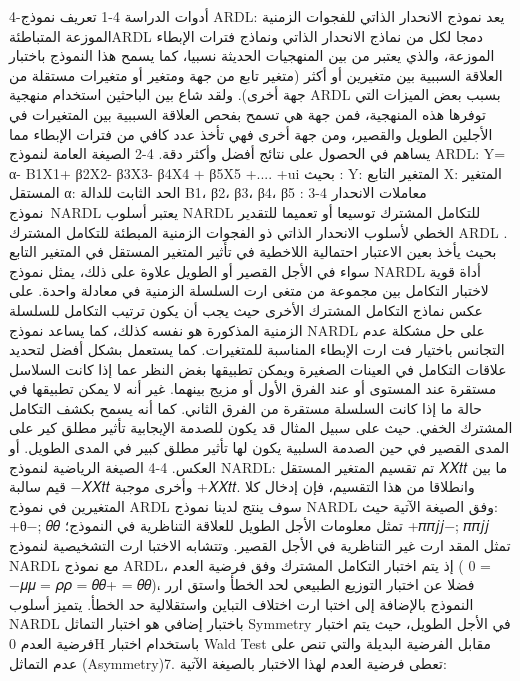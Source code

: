 \documentclass[12pt,a4paper]{report}
\begin{document}
4-أدوات الدراسة 
4-1 تعريف نموذج ARDL:
        يعد نموذج الانحدار الذاتي للفجوات الزمنية الموزعة المتباطئةARDL دمجا لكل من نماذج الانحدار الذاتي ونماذج فترات الإبطاء الموزعة، والذي يعتبر من بين المنهجيات الحديثة نسبيا، كما يسمح هذا النموذج باختبار العلاقة السببية بين متغيرين أو أكثر (متغير تابع من جهة ومتغير أو متغيرات مستقلة من جهة أخرى). ولقد شاع بين الباحثين استخدام منهجية ARDL بسبب بعض الميزات التي توفرها هذه المنهجية، فمن جهة هي تسمح بفحص العلاقة السببية بين المتغيرات في الأجلين الطويل والقصير، ومن جهة أخرى فهي تأخذ عدد كافي من فترات الإبطاء مما يساهم في الحصول على نتائج أفضل وأكثر دقة.
4-2 الصيغة العامة لنموذج ARDL:
     Y= α-  Β1X1+ β2X2- β3X3- β4X4 + β5X5 +.... +ui  
بحيث :
Y: المتغير التابع
X: المتغير المستقل 
α: الحد الثابت للدالة
Β1، β2، β3، β4، β5 : معاملات الانحدار 
4-3 نموذج NARDL 
      یعتبر أسلوب NARDL للتكامل المشترك  توسيعا أو تعميما للتقدير الخطي لأسلوب الانحدار الذاتي ذو الفجوات الزمنیة المبطئة للتكامل المشترك ARDL	. بحیث یأخذ بعین الاعتبار احتمالية اللاخطیة في تأثیر المتغير المستقل في المتغير التابع سواء في الأجل القصير أو الطويل علاوة على ذلك، یمثل نموذج NARDL أداة قویة لاختبار التكامل بین مجموعة من متغی ارت السلسلة الزمنية في معادلة واحدة. على عكس نماذج التكامل المشترك الأخرى حیث یجب أن یكون ترتیب التكامل للسلسلة الزمنیة المذكورة هو نفسه كذلك، كما یساعد نموذج NARDL على حل مشكلة عدم التجانس باختیار فت ارت الإبطاء المناسبة للمتغیرات. 
     كما یستعمل بشكل أفضل لتحدید علاقات التكامل في العینات الصغیرة ویمكن تطبیقها بغض النظر عما إذا كانت السلاسل مستقرة عند المستوى أو عند الفرق الأول أو مزیج بینهما. غیر أنه لا یمكن تطبیقها في حالة ما إذا كانت السلسلة مستقرة من الفرق الثاني. كما أنه یسمح بكشف التكامل المشترك الخفي. حیث على سبیل المثال قد یكون للصدمة الإیجابیة تأثیر مطلق كیر على المدى القصیر في حین الصدمة السلبية یكون لها تأثیر مطلق كبیر في المدى الطويل. أو العكس.
4-4 الصیغة الریاضیة لنموذج NARDL: 
    تم تقسیم المتغیر المستقل 𝑋𝑋𝑡𝑡 ما بین قیم سالبة −𝑋𝑋𝑡𝑡 وأخرى موجبة +𝑋𝑋𝑡𝑡. وانطلاقا من هذا التقسيم، فإن إدخال كلا المتغيرين في نموذج ARDL سوف ینتج لدینا نموذج NARDL وفق الصيغة الآتية
حیث: +θ−; 𝜃𝜃  تمثل معلومات الأجل الطویل للعلاقة التناظریة في النموذج؛ +𝜋𝜋𝑗𝑗−; 𝜋𝜋𝑗𝑗  تمثل المقد ارت غیر التناظریة في الأجل القصیر. 
      وتتشابه الاختبا ارت التشخیصیة لنموذج NARDL  مع نموذج ARDL، إذ یتم اختبار التكامل المشترك وفق فرضیة العدم ( 0 = −𝜇𝜇 = 𝜌𝜌 = 𝜃𝜃+ = 𝜃𝜃)، فضلا عن اختبار التوزیع الطبیعي لحد الخطأ واستق ارر النموذج بالإضافة إلى اختبا ارت اختلاف التباین واستقلالیة حد الخطأ. 
   یتمیز أسلوب NARDL باختبار إضافي هو اختبار التماثل Symmetry في الأجل الطویل، حیث یتم اختبار فرضیة العدم 0H باستخدام اختبار Wald Test مقابل الفرضیة البدیلة والتي تنص على عدم التماثل (Asymmetry)7. تعطى فرضیة العدم لهذا الاختبار بالصیغة الآتیة: 
\end{document}
